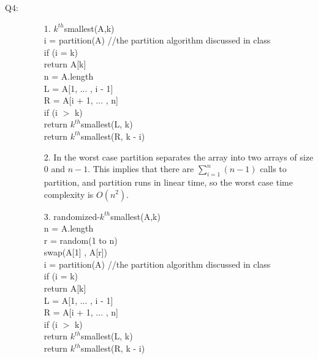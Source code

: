 \documentclass{article}
\begin{document}
\begin{description}
\item[Q4:] 
\begin{itemize}
\item[1.] 
$k^{th}$smallest(A,k)\\
\hspace*{5mm}i = partition(A)   //the partition algorithm discussed in class\\
\hspace*{5mm}if (i = k)\\
\hspace*{10mm}return A[k]\\
\hspace*{5mm}n = A.length\\
\hspace*{5mm}L = A[1, ... , i - 1]\\
\hspace*{5mm}R = A[i + 1, ... , n]\\
\hspace*{5mm}if (i $>$ k)\\
\hspace*{10mm}return $k^{th}$smallest(L, k)\\
\hspace*{5mm}return $k^{th}$smallest(R, k - i)
\vspace{2mm}
\item[2.] 
In the worst case partition separates the array into two arrays of size 0 and $n-1$. This implies that there are $\sum_{i=1}^{n} (n-1)$ calls to partition, and partition runs in linear time, so the worst case time complexity is $O(n^2)$.
\vspace{2mm}
\item[3.]
randomized-$k^{th}$smallest(A,k)\\
\hspace*{5mm}n = A.length\\
\hspace*{5mm}r = random(1 to n)\\
\hspace*{5mm}swap(A[1] , A[r])\\
\hspace*{5mm}i = partition(A)   //the partition algorithm discussed in class\\
\hspace*{5mm}if (i = k)\\
\hspace*{10mm}return A[k]\\
\hspace*{5mm}L = A[1, ... , i - 1]\\
\hspace*{5mm}R = A[i + 1, ... , n]\\
\hspace*{5mm}if (i $>$ k)\\
\hspace*{10mm}return $k^{th}$smallest(L, k)\\
\hspace*{5mm}return $k^{th}$smallest(R, k - i)\\



\end{itemize}
\end{description}
\end{document}
